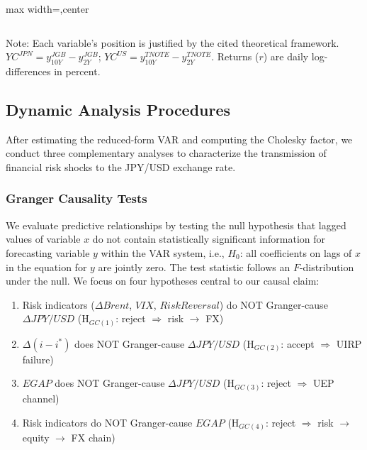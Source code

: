 \documentclass[12pt]{article}
\newenvironment{safetable}[1][\textwidth]{\begin{adjustbox}{max width=#1,center}}{\end{adjustbox}}
\begin{document}
\begin{table}[H]
\begin{safetable}
\begin{threeparttable}
\begin{tabular}{clll}
        \bottomrule
      \end{tabular}
      \begin{tablenotes}
        \item \footnotesize Note: Each variable's position is justified by the cited theoretical framework. $YC^{JPN} = y_{10Y}^{JGB} - y_{2Y}^{JGB}$; $YC^{US} = y_{10Y}^{TNOTE} - y_{2Y}^{TNOTE}$. Returns ($r$) are daily log-differences in percent.
      \end{tablenotes}
    \end{threeparttable}
  \end{safetable}
\end{table}

\subsection{Dynamic Analysis Procedures}

{} After estimating the reduced-form VAR and computing the Cholesky factor, we conduct three complementary analyses to characterize the transmission of financial risk shocks to the JPY/USD exchange rate.

\subsubsection{Granger Causality Tests}

{} We evaluate predictive relationships by testing the null hypothesis that lagged values of variable $x$ do not contain statistically significant information for forecasting variable $y$ within the VAR system, i.e., $H_0$: all coefficients on lags of $x$ in the equation for $y$ are jointly zero. The test statistic follows an $F$-distribution under the null. We focus on four hypotheses central to our causal claim:

\begin{enumerate}
  \item Risk indicators ($\Delta Brent$, $VIX$, $RiskReversal$) do NOT Granger-cause $\Delta JPY/USD$ \hfill (H$_{GC(1)}$: reject $\Rightarrow$ risk $\rightarrow$ FX)
  \item $\Delta(i-i^*)$ does NOT Granger-cause $\Delta JPY/USD$ \hfill (H$_{GC(2)}$: accept $\Rightarrow$ UIRP failure)
  \item $EGAP$ does NOT Granger-cause $\Delta JPY/USD$ \hfill (H$_{GC(3)}$: reject $\Rightarrow$ UEP channel)
  \item Risk indicators do NOT Granger-cause $EGAP$ \hfill (H$_{GC(4)}$: reject $\Rightarrow$ risk $\rightarrow$ equity $\rightarrow$ FX chain)
\end{enumerate}
\end{document}
